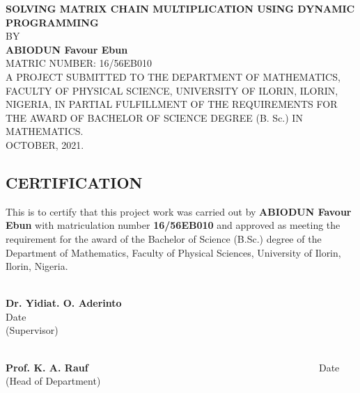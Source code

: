 \documentclass[12pt]{report}
\begin{document}
	\setcounter{page}{1}
	\begin{titlepage}
		\begin{center}
			\textbf{\large {SOLVING MATRIX CHAIN MULTIPLICATION USING DYNAMIC PROGRAMMING}}
			\\[20pt]
			BY
			\\[20pt]
			\textbf{ABIODUN Favour Ebun}
			\\[20pt]
			MATRIC NUMBER: 16/56EB010
			\\[20pt]
			\vspace{2cm}
			A PROJECT SUBMITTED TO THE DEPARTMENT OF MATHEMATICS, FACULTY OF PHYSICAL SCIENCE, UNIVERSITY OF ILORIN, ILORIN, NIGERIA, IN PARTIAL FULFILLMENT OF THE REQUIREMENTS FOR THE AWARD OF BACHELOR OF SCIENCE DEGREE (B. Sc.) IN MATHEMATICS.
			\\[35pt]
			OCTOBER, 2021.
		\end{center}
	\end{titlepage}
	
	\newpage
	\begin{center}
		\section*{CERTIFICATION}
	\end{center}
	This is to certify that this project work was carried out by \textbf{ABIODUN Favour Ebun} with matriculation number \textbf{16/56EB010} and approved as meeting the requirement for the award of the Bachelor of Science (B.Sc.) degree of the Department of Mathematics, Faculty of Physical Sciences, University of Ilorin, Ilorin, Nigeria.
	
	\vspace{.99in}
	\noindent
	\dotfill			\hfill			\dotfill\\
	\textbf{Dr. Yidiat. O. Aderinto} ~~~~~~~~~~~~~~~~~~~~~~~~~~~~~~~~~~~~~~~~~~~~~~\qqquad
	Date\\
	(Supervisor)
	
	\vspace{.99in}
	\noindent
	\dotfill			\hfill			\dotfill\\
	\textbf{Prof. K. A. Rauf} ~~~~~~~~~~~~~~~~~~~~~~~~~~~~~~~~~~~~~~~~~~~~~~\qquad
	Date\\
	(Head of Department)
	
\end{document}
